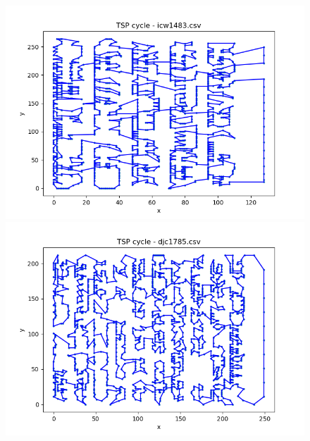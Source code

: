 \documentclass[12pt]{article}
\begin{document}
        \begin{figure}[h]
            \centering
            \includegraphics[width=0.8\linewidth]{img/icw1483.png}
            \label{fig:icw1483}
            \includegraphics[width=0.8\linewidth]{img/djc1785.png}
            \label{fig:djc1785}
        \end{figure}

        \newpage
\end{document}

